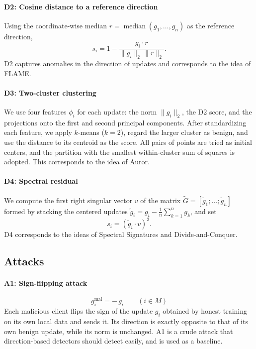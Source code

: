 \documentclass[a4paper,10pt]{article}
\begin{document}
\paragraph{D2: Cosine distance to a reference direction}
Using the coordinate-wise median $r = \operatorname{median}(g_1,\dots,g_n)$ as the reference direction,
\begin{equation}
s_i = 1 - \frac{g_i \cdot r}{\|g_i\|_2\,\|r\|_2}.
\end{equation}
D2 captures anomalies in the direction of updates and corresponds to the idea of FLAME\cite{nguyen2022flame}.

\paragraph{D3: Two-cluster clustering}
We use four features $\phi_i$ for each update: the norm $\|g_i\|_2$, the D2 score, and the projections onto the first and second principal components. After standardizing each feature, we apply $k$-means ($k=2$), regard the larger cluster as benign, and use the distance to its centroid as the score. All pairs of points are tried as initial centers, and the partition with the smallest within-cluster sum of squares is adopted. This corresponds to the idea of Auror\cite{shen2016auror}.

\paragraph{D4: Spectral residual}
We compute the first right singular vector $v$ of the matrix $\tilde{G} = [\tilde{g}_1;\dots;\tilde{g}_n]$ formed by stacking the centered updates $\tilde{g}_i = g_i - \frac{1}{n}\sum_{k=1}^{n} g_k$, and set
\begin{equation}
s_i = (\tilde{g}_i \cdot v)^2 .
\end{equation}
D4 corresponds to the ideas of Spectral Signatures\cite{tran2018spectral} and Divide-and-Conquer\cite{shejwalkar2021manipulating}.

\subsection{Attacks}
\label{sec:attacks}

\paragraph{A1: Sign-flipping attack}
\begin{equation}
g_i^{\text{mal}} = -\,g_i \qquad (i \in M)
\end{equation}
Each malicious client flips the sign of the update $g_i$ obtained by honest training on its own local data and sends it. Its direction is exactly opposite to that of its own benign update, while its norm is unchanged. A1 is a crude attack that direction-based detectors should detect easily, and is used as a baseline.
\end{document}
